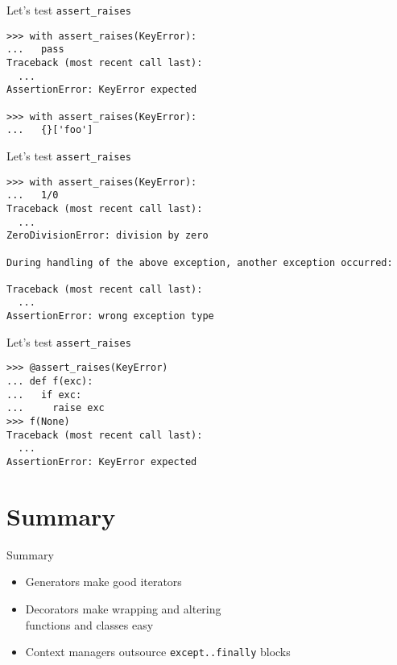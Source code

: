 \documentclass{beamer}
\begin{document}
\begin{frame}[fragile]{Let's test \texttt{assert\_raises}}
  \begin{verbatim}
>>> with assert_raises(KeyError):
...   pass
Traceback (most recent call last):
  ...
AssertionError: KeyError expected

>>> with assert_raises(KeyError):
...   {}['foo']
  \end{verbatim}
\end{frame}
\begin{frame}[fragile]{Let's test \texttt{assert\_raises}}
  \begin{verbatim}
>>> with assert_raises(KeyError):
...   1/0
Traceback (most recent call last):
  ...
ZeroDivisionError: division by zero

During handling of the above exception, another exception occurred:

Traceback (most recent call last):
  ...
AssertionError: wrong exception type
  \end{verbatim}
\end{frame}

\begin{frame}[fragile]{Let's test \texttt{assert\_raises}}
  \begin{verbatim}
>>> @assert_raises(KeyError)
... def f(exc):
...   if exc:
...     raise exc
>>> f(None)
Traceback (most recent call last):
  ...
AssertionError: KeyError expected
  \end{verbatim}
\end{frame}


\section*{Summary}

\begin{frame}{Summary}

  \begin{itemize}[<+->]
  \item
    \alert{Generators} make good iterators
  \item
    \alert{Decorators} make wrapping and altering\\functions and classes easy
  \item
    \alert{Context managers} outsource \texttt{except..finally} blocks
  \end{itemize}
\end{frame}
\end{document}
